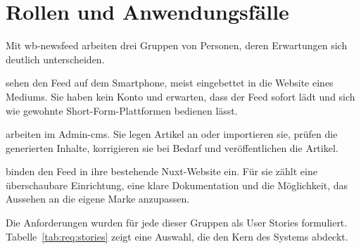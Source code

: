 \section{Rollen und Anwendungsfälle}
\setauthor{\secondauthor}

Mit wb-newsfeed arbeiten drei Gruppen von Personen, deren Erwartungen sich deutlich unterscheiden.

\begin{compactdesc}
    \item[Leser:innen] sehen den Feed auf dem Smartphone, meist eingebettet in die Website eines Mediums. Sie haben kein Konto und erwarten, dass der Feed sofort lädt und sich wie gewohnte Short-Form-Plattformen bedienen lässt.
    \item[Redakteur:innen] arbeiten im Admin-\gls{cms}. Sie legen Artikel an oder importieren sie, prüfen die generierten Inhalte, korrigieren sie bei Bedarf und veröffentlichen die Artikel.
    \item[Entwickler:innen der Host-Website] binden den Feed in ihre bestehende Nuxt-Website ein. Für sie zählt eine überschaubare Einrichtung, eine klare Dokumentation und die Möglichkeit, das Aussehen an die eigene Marke anzupassen.
\end{compactdesc}

Die Anforderungen wurden für jede dieser Gruppen als User Stories formuliert.
Tabelle~\ref{tab:req:stories} zeigt eine Auswahl, die den Kern des Systems abdeckt.

